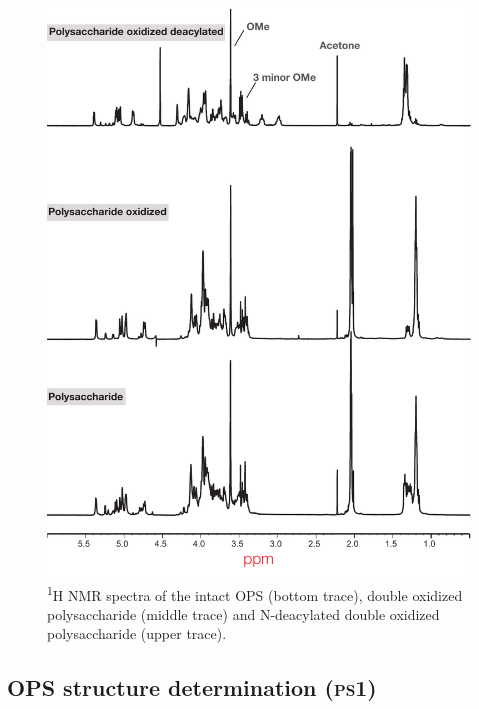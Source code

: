 \begin{figure}[ph] %
  \begin{center}
    \includegraphics[height=0.9\textheight]{lps_chapter/img/lpsfig1.pdf}
  \end{center}
  \caption[\textsuperscript{1}H \ac{NMR} spectra of \caulobacter{} \ac{OPS}]{\textsuperscript{1}H
    \ac{NMR} spectra of the intact \caulobacter{} \ac{OPS} (bottom trace), double oxidized
    polysaccharide (middle trace) and N-deacylated double oxidized polysaccharide (upper trace).}
  \label{fig:lpsfig1}
\end{figure}


\subsection{\ac{OPS} structure determination (\textsc{ps}1)} %
\label{sub:o_antigen_structure_determination_ps1_}

